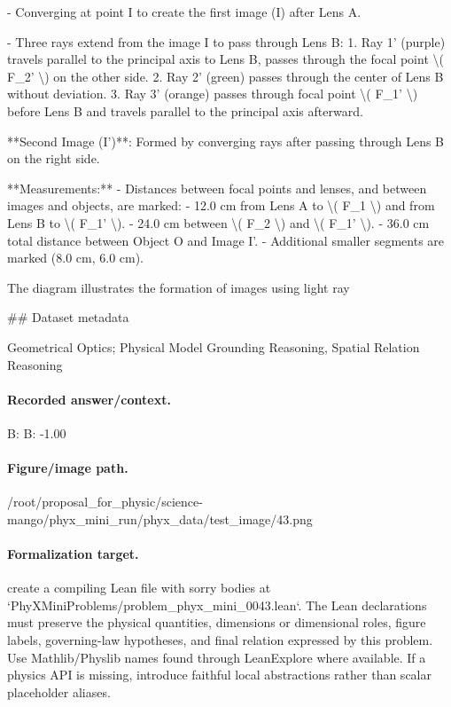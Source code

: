- Converging at point I to create the first image (I) after Lens A.

- Three rays extend from the image I to pass through Lens B:
  1. Ray 1' (purple) travels parallel to the principal axis to Lens B, passes through the focal point \textbackslash{}( F\_2' \textbackslash{}) on the other side.
  2. Ray 2' (green) passes through the center of Lens B without deviation.
  3. Ray 3' (orange) passes through focal point \textbackslash{}( F\_1' \textbackslash{}) before Lens B and travels parallel to the principal axis afterward.

**Second Image (I')**: Formed by converging rays after passing through Lens B on the right side.

**Measurements:**
- Distances between focal points and lenses, and between images and objects, are marked:
  - 12.0 cm from Lens A to \textbackslash{}( F\_1 \textbackslash{}) and from Lens B to \textbackslash{}( F\_1' \textbackslash{}).
  - 24.0 cm between \textbackslash{}( F\_2 \textbackslash{}) and \textbackslash{}( F\_1' \textbackslash{}).
  - 36.0 cm total distance between Object O and Image I'.
  - Additional smaller segments are marked (8.0 cm, 6.0 cm).

The diagram illustrates the formation of images using light ray

\#\# Dataset metadata

Geometrical Optics; Physical Model Grounding Reasoning, Spatial Relation Reasoning

\paragraph{Recorded answer/context.}
B: B: -1.00

\paragraph{Figure/image path.}
/root/proposal\_for\_physic/science-mango/phyx\_mini\_run/phyx\_data/test\_image/43.png

\paragraph{Formalization target.}
create a compiling Lean file with sorry bodies at `PhyXMiniProblems/problem\_phyx\_mini\_0043.lean`. The Lean declarations must preserve the physical quantities, dimensions or dimensional roles, figure labels, governing-law hypotheses, and final relation expressed by this problem.
Use Mathlib/Physlib names found through LeanExplore where available. If a physics API is missing, introduce faithful local abstractions rather than scalar placeholder aliases.

